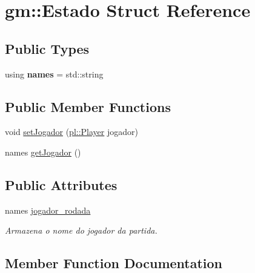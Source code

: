 \hypertarget{structgm_1_1Estado}{}\section{gm\+:\+:Estado Struct Reference}
\label{structgm_1_1Estado}
\subsection*{Public Types}
\begin{DoxyCompactItemize}
\item 
\mbox{\label{structgm_1_1Estado_a10d7c0f940aa4e7468cf803998d3c522}} 
using {\bfseries names} = std\+::string
\end{DoxyCompactItemize}
\subsection*{Public Member Functions}
\begin{DoxyCompactItemize}
\item 
void \hyperlink{structgm_1_1Estado_a8ee0f3264a4ca3c1c19176cf91b06376}{set\+Jogador} (\hyperlink{structpl_1_1Player}{pl\+::\+Player} jogador)
\item 
names \hyperlink{structgm_1_1Estado_a536f3b791af50c6ebd2655f285cd6d64}{get\+Jogador} ()
\end{DoxyCompactItemize}
\subsection*{Public Attributes}
\begin{DoxyCompactItemize}
\item 
\mbox{\label{structgm_1_1Estado_ad53512683ba47250bb447bbd6fc488ef}} 
names \hyperlink{structgm_1_1Estado_ad53512683ba47250bb447bbd6fc488ef}{jogador\+\_\+rodada}
\begin{DoxyCompactList}\small\item\em Armazena o nome do jogador da partida. \end{DoxyCompactList}\end{DoxyCompactItemize}


\subsection{Member Function Documentation}
\mbox{\label{structgm_1_1Estado_a536f3b791af50c6ebd2655f285cd6d64}} 
